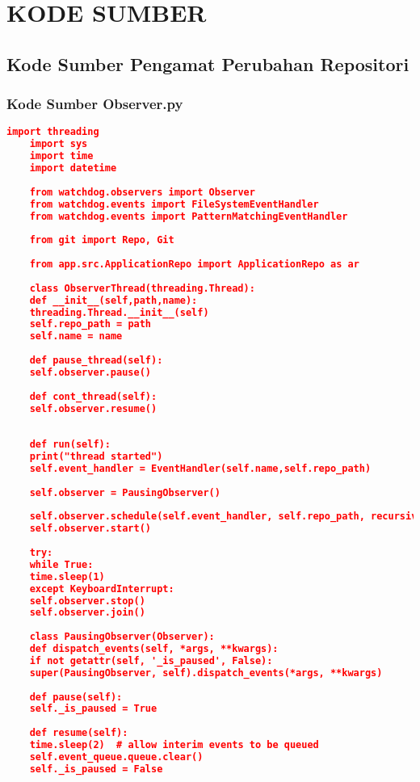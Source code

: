 \chapter{KODE SUMBER}

\section*{Kode Sumber Pengamat Perubahan Repositori}
	\subsection*{Kode Sumber Observer.py}
	\begin{lstlisting}[frame=single,tabsize=2,breaklines,caption={Kode sumber Observer.py},label=observer, captionpos=b, language=json]
	import threading
	import sys
	import time
	import datetime
	
	from watchdog.observers import Observer
	from watchdog.events import FileSystemEventHandler
	from watchdog.events import PatternMatchingEventHandler
	
	from git import Repo, Git
	
	from app.src.ApplicationRepo import ApplicationRepo as ar
	
	class ObserverThread(threading.Thread):
	def __init__(self,path,name):
	threading.Thread.__init__(self)
	self.repo_path = path
	self.name = name
	
	def pause_thread(self):
	self.observer.pause()
	
	def cont_thread(self):
	self.observer.resume()
	
	
	def run(self):
	print("thread started")
	self.event_handler = EventHandler(self.name,self.repo_path)
	
	self.observer = PausingObserver()
	
	self.observer.schedule(self.event_handler, self.repo_path, recursive=True)
	self.observer.start()
	
	try:
	while True:
	time.sleep(1)
	except KeyboardInterrupt:
	self.observer.stop()
	self.observer.join()
	
	class PausingObserver(Observer):
	def dispatch_events(self, *args, **kwargs):
	if not getattr(self, '_is_paused', False):
	super(PausingObserver, self).dispatch_events(*args, **kwargs)
	
	def pause(self):
	self._is_paused = True
	
	def resume(self):
	time.sleep(2)  # allow interim events to be queued
	self.event_queue.queue.clear()
	self._is_paused = False
	

\end{lstlisting}
